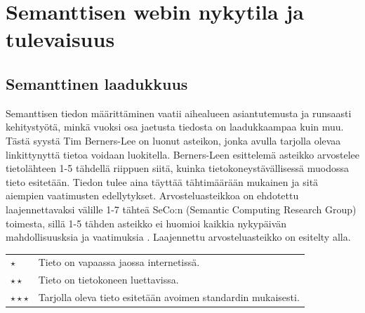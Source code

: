 \documentclass[finnish, 12pt, a4paper, elec, utf8, pdfa, online]{aaltothesis}
\begin{document}
{%

\clearpage
\section{Semanttisen webin nykytila ja tulevaisuus}






\subsection{Semanttinen laadukkuus} %
Semanttisen tiedon määrittäminen vaatii aihealueen asiantutemusta ja runsaasti kehitystyötä, minkä vuoksi osa jaetusta tiedosta on laadukkaampaa kuin muu. Tästä syystä Tim Berners-Lee on luonut asteikon, jonka avulla tarjolla olevaa linkittynyttä tietoa voidaan luokitella. Berners-Leen esittelemä asteikko arvostelee tietolähteen 1-5 tähdellä riippuen siitä, kuinka tietokoneystävällisessä muodossa tieto esitetään. Tiedon tulee aina täyttää tähtimäärään mukainen ja sitä aiempien vaatimusten edellytykset. Arvosteluasteikkoa on ehdotettu laajennettavaksi välille 1-7 tähteä SeCo:n (Semantic Computing Research Group) toimesta, sillä 1-5 tähden asteikko ei huomioi kaikkia nykypäivän mahdollisuusksia ja vaatimuksia \cite{SeCo_stars}. Laajennettu arvosteluasteikko on esitelty alla.

\begin{tabular}{ll}
\vspace*{0.2cm}
$\star$                     & Tieto on vapaassa jaossa internetissä. \\
\vspace*{0.2cm}
$\star \star$                & Tieto on tietokoneen luettavissa. \\
\vspace*{0.2cm}
$\star\star\star$           & Tarjolla oleva tieto esitetään avoimen standardin mukaisesti. \\


\end{tabular}}
\end{document}
